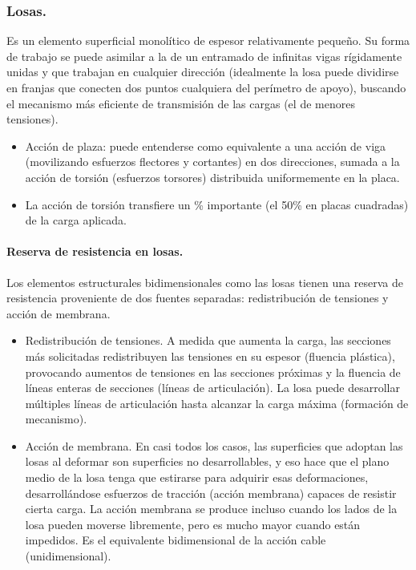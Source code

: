 \subsubsection{Losas.}
Es un elemento superficial monolítico de espesor relativamente pequeño. Su forma de trabajo se puede asimilar a la de un entramado de infinitas vigas rígidamente unidas y que trabajan en cualquier dirección (idealmente la losa puede dividirse en franjas que conecten dos puntos cualquiera del perímetro de apoyo), buscando el mecanismo más eficiente de transmisión de las cargas (el de menores tensiones). 
\begin{itemize}
    \item Acción de plaza: puede entenderse como equivalente a una acción de viga  (movilizando esfuerzos flectores y cortantes) en dos direcciones, sumada a la acción de torsión (esfuerzos torsores) distribuida uniformemente en la placa.
    \item La acción de torsión transfiere un \% importante (el 50\% en placas cuadradas) de la carga aplicada.
\end{itemize}

\paragraph{Reserva de resistencia en losas.}
Los elementos estructurales bidimensionales como las losas tienen una reserva de resistencia proveniente de dos fuentes separadas: redistribución de tensiones y acción de membrana.
\begin{itemize}
    \item Redistribución de tensiones. A medida que aumenta la carga, las secciones más solicitadas redistribuyen las tensiones en su espesor (fluencia plástica), provocando aumentos de tensiones en las secciones próximas y la fluencia de líneas enteras de secciones (líneas de articulación). La losa puede desarrollar múltiples líneas de articulación hasta alcanzar la carga máxima (formación de mecanismo).
    \item Acción de membrana. En casi todos los casos, las superficies que adoptan las losas al deformar son superficies no desarrollables, y eso hace que el plano medio de la losa tenga que estirarse para adquirir esas deformaciones, desarrollándose esfuerzos de tracción (acción membrana) capaces de resistir cierta carga. La acción membrana se produce incluso cuando los lados de la losa pueden moverse libremente, pero es mucho mayor cuando están impedidos. Es el equivalente bidimensional de la acción cable (unidimensional).
\end{itemize}


